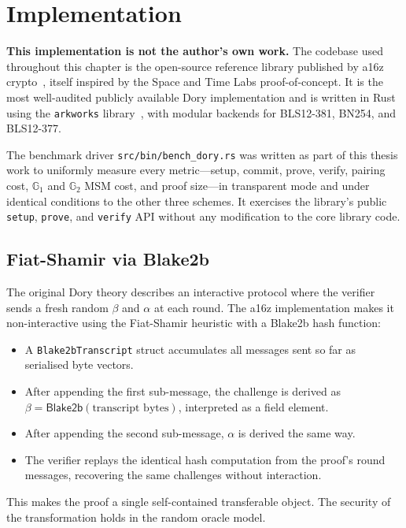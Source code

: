 \section{Implementation}

\textbf{This implementation is not the author's own work.} The codebase used
throughout this chapter is the open-source reference library published by
a16z crypto~\cite{a16z2022dory}, itself inspired by the Space and Time Labs
proof-of-concept. It is the most well-audited publicly available Dory
implementation and is written in Rust using the \texttt{arkworks}
library~\cite{arkworks}, with modular backends for BLS12-381, BN254, and
BLS12-377.

The benchmark driver \texttt{src/bin/bench\_dory.rs} was written as part of
this thesis work to uniformly measure every metric---setup, commit, prove,
verify, pairing cost, $\mathbb{G}_1$ and $\mathbb{G}_2$ MSM cost, and proof
size---in transparent mode and under identical conditions to the other three
schemes. It exercises the library's public \texttt{setup}, \texttt{prove},
and \texttt{verify} API without any modification to the core library code.

\subsection{Fiat-Shamir via Blake2b}

The original Dory theory describes an interactive protocol where the verifier
sends a fresh random $\beta$ and $\alpha$ at each round. The a16z
implementation makes it non-interactive using the Fiat-Shamir heuristic with
a Blake2b hash function:

\begin{itemize}
    \item A \texttt{Blake2bTranscript} struct accumulates all messages sent
          so far as serialised byte vectors.
    \item After appending the first sub-message, the challenge is derived as
          $\beta = \mathsf{Blake2b}(\text{transcript bytes})$, interpreted as
          a field element.
    \item After appending the second sub-message, $\alpha$ is derived the same
          way.
    \item The verifier replays the identical hash computation from the proof's
          round messages, recovering the same challenges without interaction.
\end{itemize}

This makes the proof a single self-contained transferable object. The
security of the transformation holds in the random oracle model.

